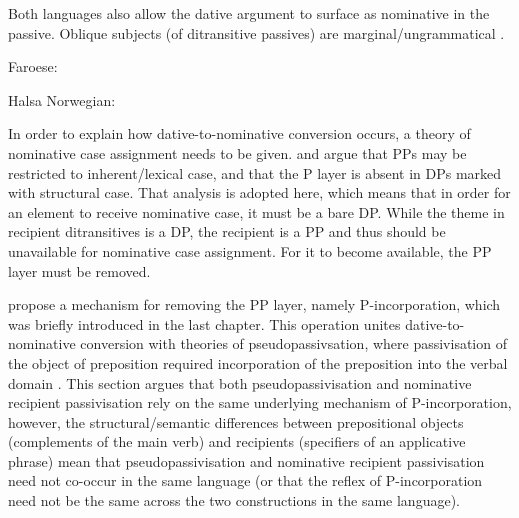Both languages also allow the dative argument to surface as nominative in the passive. Oblique subjects (of ditransitive passives) are marginal/ungrammatical \citep{Eyorsson.2012}.

\begin{exe}
	\ex Faroese:\label{ex:far-pass}
	\begin{xlist}
	\end{xlist}
	\ex Halsa Norwegian:\label{ex:halsa-pass}
	\begin{xlist}
	\end{xlist}
\end{exe}

In order to explain how dative-to-nominative conversion occurs, a theory of nominative case assignment needs to be given. \cite{Bayer.2001} and \cite{Asbury.2005,Asbury.2007} argue that PPs may be restricted to inherent/lexical case, and that the P layer is absent in DPs marked with structural case. That analysis is adopted here, which means that in order for an element to receive nominative case, it must be a bare DP. While the theme in recipient ditransitives is a DP, the recipient is a PP and thus should be unavailable for nominative case assignment. For it to become available, the PP layer must be removed.

\cite{Alexiadou.2013b} propose a mechanism for removing the PP layer, namely P-incorporation, which was briefly introduced in the last chapter. This operation unites dative-to-nominative conversion with theories of pseudopassivsation, where passivisation of the object of preposition required incorporation of the preposition into the verbal domain \citep{Herslund.1984}. This section argues that both pseudopassivisation and nominative recipient passivisation rely on the same underlying mechanism of P-incorporation, however, the structural/semantic differences between prepositional objects (complements of the main verb) and recipients (specifiers of an applicative phrase) mean that pseudopassivisation and nominative recipient passivisation need not co-occur in the same language (or that the reflex of P-incorporation need not be the same across the two constructions in the same language).

